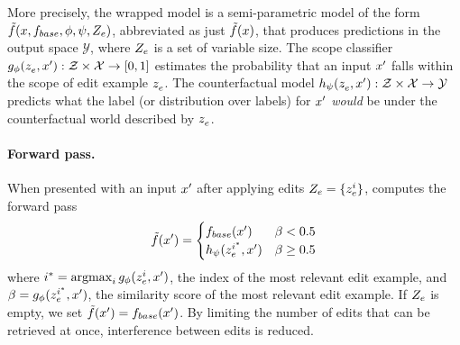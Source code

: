 \documentclass{article}
\begin{document}


More precisely, the wrapped model is a semi-parametric model of the form $\semimodel(x, \basemodel, \phi, \psi, \edits)$, abbreviated as just $\semimodel(x)$, that produces predictions in the output space $\mathcal{Y}$, where $\edits$ is a set of variable size. The scope classifier $\cls(\ze, \xunk) : \mathcal{Z} \times \inp  \rightarrow [0, 1]$ estimates the probability that an input $\xunk$ falls within the scope of edit example $\ze$. The counterfactual model $\rep(\ze, \xunk) : \mathcal{Z} \times \inp \rightarrow \out$ predicts what the label (or distribution over labels) for $\xunk$ \textit{would} be under the counterfactual world described by $\ze$. 

\paragraph{Forward pass.} When presented with an input $\xunk$ after applying edits $\edits = \{\ze[i]\}$, {\name} computes the forward pass
\begin{equation}
    \semimodel(\xunk) = 
    \begin{cases}
        \basemodel(\xunk) & \beta < 0.5 \\
        \rep(\ze[i^*], \xunk) & \beta \ge 0.5
    \end{cases}
\end{equation}
where $i^* = \argmax_i \cls(\ze[i], \xunk)$, the index of the most relevant edit example, and $\beta = \cls( \ze[i^*], \xunk)$, the similarity score of the most relevant edit example. If $\edits$ is empty, we set $\semimodel(\xunk) = \basemodel(\xunk)$. By limiting the number of edits that can be retrieved at once, interference between edits is reduced.


\end{document}
